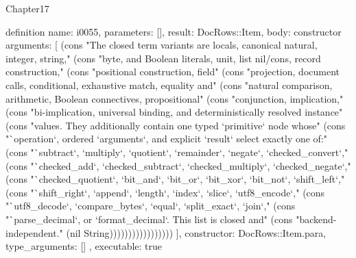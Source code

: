 \begin{lexlean}{Chapter17}
\begin{semanticmodule}
definition{
  name: i0055,
  parameters: [],
  result: DocRows::Item,
  body: constructor{
    arguments: [
      (cons "The closed term variants are locals, canonical natural, integer, string," (cons "byte, and Boolean literals, unit, list nil/cons, record construction," (cons "positional construction, field" (cons "projection, document calls, conditional, exhaustive match, equality and" (cons "natural comparison, arithmetic, Boolean connectives, propositional" (cons "conjunction, implication," (cons "bi-implication, universal binding, and deterministically resolved instance" (cons "values. They additionally contain one typed `primitive` node whose" (cons "`operation`, ordered `arguments`, and explicit `result` select exactly one of:" (cons "`subtract`, `multiply`, `quotient`, `remainder`, `negate`, `checked_convert`," (cons "`checked_add`, `checked_subtract`, `checked_multiply`, `checked_negate`," (cons "`checked_quotient`, `bit_and`, `bit_or`, `bit_xor`, `bit_not`, `shift_left`," (cons "`shift_right`, `append`, `length`, `index`, `slice`, `utf8_encode`," (cons "`utf8_decode`, `compare_bytes`, `equal`, `split_exact`, `join`," (cons "`parse_decimal`, or `format_decimal`. This list is closed and" (cons "backend-independent." (nil String)))))))))))))))))
    ],
    constructor: DocRows::Item.para,
    type_arguments: []
  },
  executable: true
}


\end{semanticmodule}
\end{lexlean}
